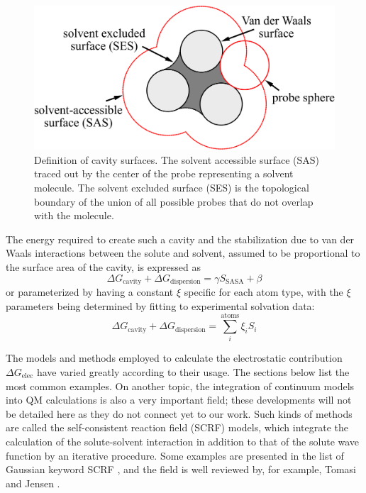 \begin{figure}[h]
\begin{centering}
\includegraphics[width=0.55\columnwidth]{_figure/SASA}
\par\end{centering}
\caption[Definition of cavity surfaces]{Definition of cavity surfaces\label{fig:sasa}. The solvent accessible
surface (SAS) traced out by the center of the probe representing a
solvent molecule. The solvent excluded surface (SES) is the topological
boundary of the union of all possible probes that do not overlap with
the molecule.}
\end{figure}

The energy required to create such a cavity and the stabilization
due to van der Waals interactions between the solute and solvent,
assumed to be proportional to the surface area of the cavity, is expressed
as
\begin{equation}
\Delta G_{\mathrm{cavity}}+\Delta G_{\mathrm{dispersion}}=\gamma S_{\mathrm{SASA}}+\beta
\end{equation}
or parameterized by having a constant $\xi$ specific for each atom
type, with the $\xi$ parameters being determined by fitting to experimental
solvation data:
\begin{equation}
\Delta G_{\mathrm{cavity}}+\Delta G_{\mathrm{dispersion}}=\sum_{i}^{\mathrm{atoms}}\xi_{i}S_{i}
\end{equation}

The models and methods employed to calculate the electrostatic contribution
$\Delta G_{\mathrm{elec}}$ have varied greatly according to their
usage. The sections below list the most common examples. On another
topic, the integration of continuum models into \acs{QM} calculations
is also a very important field; these developments will not be detailed
here as they do not connect yet to our work. Such kinds of methods
are called the self-consistent reaction field (SCRF) models, which
integrate the calculation of the solute-solvent interaction in addition
to that of the solute wave function by an iterative procedure. Some
examples are presented in the list of Gaussian keyword SCRF \citep{scrf},
and the field is well reviewed by, for example, Tomasi \citep{Tomasi_1994_implicit_model,tomasi_quantum_2005}
and Jensen \citep{Jensen}.

